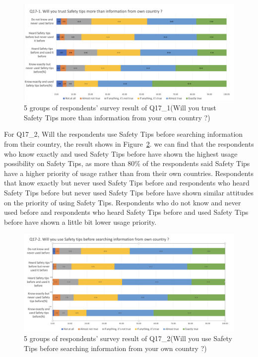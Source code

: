 \begin{figure}[h]
  \includegraphics[width=0.8\linewidth]{Figure/Figure19.jpg}
  \centering
  \caption[5 groups of respondents' survey result of Q17\_1]{5 groups of respondents' survey result of Q17\_1(Will you trust Safety Tips more than information from your own country ?)}
  \label{fig19}
\end{figure}

For Q17\_2, Will the respondents use Safety Tips before searching information from their country, the result shows in Figure~\ref{fig20}. we can find that the respondents who know exactly and used Safety Tips before have shown the highest usage possibility on Safety Tips, as more than 80\% of the respondents said Safety Tips have a higher priority of usage rather than from their own countries. Respondents that know exactly but never used Safety Tips before and respondents who heard Safety Tips before but never used Safety Tips before have shown similar attitudes on the priority of using Safety Tips. Respondents who do not know and never used before and respondents who heard Safety Tips before and used Safety Tips before have shown a little bit lower usage priority. 

\begin{figure}[h]
  \includegraphics[width=0.8\linewidth]{Figure/Figure20.jpg}
  \centering
  \caption[5 groups of respondents' survey result of Q17\_2]{5 groups of respondents' survey result of Q17\_2(Will you use Safety Tips before searching information from your own country ?)}
  \label{fig20}
\end{figure}

